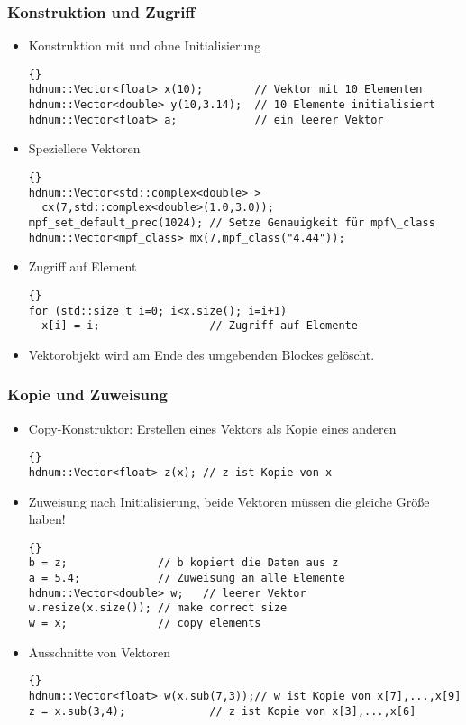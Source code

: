 \begin{frame}[fragile]
\frametitle{Konstruktion und Zugriff}
\begin{itemize}
\item Konstruktion mit und ohne Initialisierung\\
{\footnotesize{\begin{lstlisting}{}
hdnum::Vector<float> x(10);        // Vektor mit 10 Elementen
hdnum::Vector<double> y(10,3.14);  // 10 Elemente initialisiert
hdnum::Vector<float> a;            // ein leerer Vektor
\end{lstlisting}}}
\item Speziellere Vektoren\\
{\footnotesize{\begin{lstlisting}{}
hdnum::Vector<std::complex<double> >
  cx(7,std::complex<double>(1.0,3.0));
mpf_set_default_prec(1024); // Setze Genauigkeit für mpf\_class
hdnum::Vector<mpf_class> mx(7,mpf_class("4.44"));
\end{lstlisting}}}
\item Zugriff auf Element\\
{\footnotesize{\begin{lstlisting}{}
for (std::size_t i=0; i<x.size(); i=i+1)
  x[i] = i;                 // Zugriff auf Elemente
\end{lstlisting}}}
\item Vektorobjekt wird am Ende des umgebenden Blockes gelöscht.
\end{itemize}
\end{frame}

\begin{frame}[fragile]
\frametitle{Kopie und Zuweisung}
\begin{itemize}
\item Copy-Konstruktor: Erstellen eines Vektors als Kopie eines anderen
{\footnotesize{\begin{lstlisting}{}
hdnum::Vector<float> z(x); // z ist Kopie von x
\end{lstlisting}}}
\item Zuweisung nach Initialisierung, beide Vektoren
müssen die gleiche Größe haben!
{\footnotesize{\begin{lstlisting}{}
b = z;              // b kopiert die Daten aus z
a = 5.4;            // Zuweisung an alle Elemente
hdnum::Vector<double> w;   // leerer Vektor
w.resize(x.size()); // make correct size
w = x;              // copy elements
\end{lstlisting}}}
\item Ausschnitte von Vektoren\\
{\footnotesize{\begin{lstlisting}{}
hdnum::Vector<float> w(x.sub(7,3));// w ist Kopie von x[7],...,x[9]
z = x.sub(3,4);             // z ist Kopie von x[3],...,x[6]
\end{lstlisting}}}
\end{itemize}
\end{frame}

